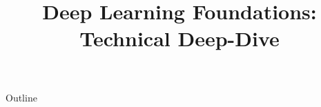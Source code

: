 \documentclass[xcolor=dvipsnames,compress,t,pdf]{beamer}
\title[\insertframenumber /\inserttotalframenumber]{Deep Learning Foundations: Technical Deep-Dive}
\begin{document}
	\begin{frame}
	\titlepage
	\end{frame}

	\begin{frame}{Outline}
	    \tableofcontents
	\end{frame}

	
	
	
\end{document}
